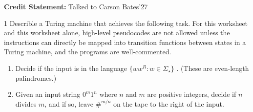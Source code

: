 \documentclass[12pt]{article}
\begin{document}


\textbf{Credit Statement:} Talked to Carson Bates'27

\begin{problem}{1}
    Describle a Turing machine that achieves the following task. For this worksheet and this worksheet alone, high-level pseudocodes are not allowed unless the instructions can directly be mapped into transition functions between states in a Turing machine, and the programs are well-commented.

    \begin{enumerate}
        \item Decide if the input is in the language $\{ww^R : w \in \Sigma_\star\}$ . (These are even-length palindromes.)
        \item Given an input string $0^m1^n$ where $n$ and $m$ are positive integers, decide if $n$ divides $m$, and if so, leave $\#^{m/n}$ on the tape to the right of the input.
    \end{enumerate}
\end{problem}
\end{document}
